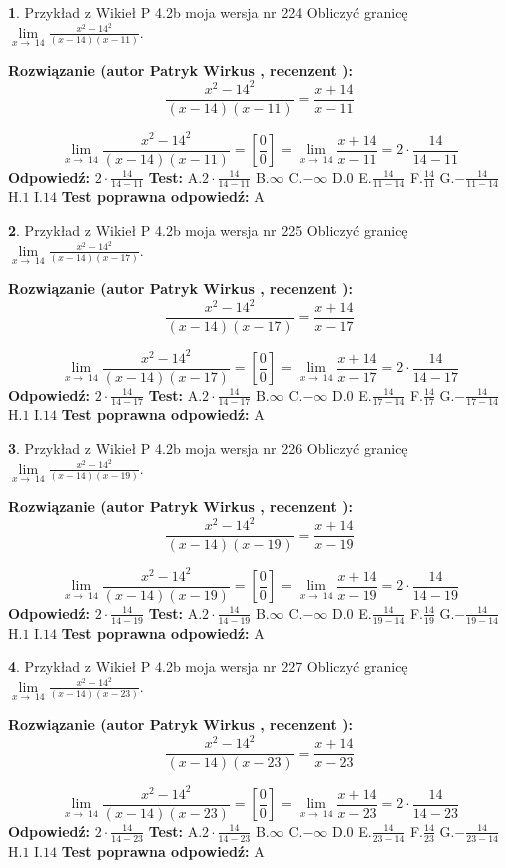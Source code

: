 \documentclass[12pt, a4paper]{article}
\theoremstyle{definition} %
\newtheorem{zad}{}
\newcommand{\zadStart}[1]{\begin{zad}#1\newline}
\newcommand{\zadStop}{\end{zad}}
\newcommand{\rozwStart}[2]{\noindent \textbf{Rozwiązanie (autor #1 , recenzent #2): }\newline}
\newcommand{\rozwStop}{\newline}
\newcommand{\odpStart}{\noindent \textbf{Odpowiedź:}\newline}
\newcommand{\odpStop}{\newline}
\newcommand{\testStart}{\noindent \textbf{Test:}\newline}
\newcommand{\testStop}{\newline}
\newcommand{\kluczStart}{\noindent \textbf{Test poprawna odpowiedź:}\newline}
\newcommand{\kluczStop}{\newline}
\begin{document}
\zadStart{Przykład z Wikieł P 4.2b moja wersja nr 224}
Obliczyć granicę $\lim\limits_{x\to\ 14}\frac{x^{2}-14^{2}}{(x-14)(x-11)}$.
\zadStop
\rozwStart{Patryk Wirkus}{}
$$\frac{x^{2}-14^{2}}{(x-14)(x-11)}=\frac{x+14}{x-11}$$

$$\lim\limits_{x\to\ 14}\frac{x^{2}-14^{2}}{(x-14)(x-11)}=[\frac{0}{0}]=\lim\limits_{x\to\ 14}\frac{x+14}{x-11}=2 \cdot \frac{14}{14-11}$$
\rozwStop
\odpStart
$2 \cdot \frac{14}{14-11}$
\odpStop
\testStart
A.$2 \cdot \frac{14}{14-11}$
B.$\infty$
C.$-\infty$
D.$0$
E.$\frac{14}{11-14}$
F.$\frac{14}{11}$
G.$-\frac{14}{11-14}$
H.$1$
I.$14$
\testStop
\kluczStart
A
\kluczStop



\zadStart{Przykład z Wikieł P 4.2b moja wersja nr 225}
Obliczyć granicę $\lim\limits_{x\to\ 14}\frac{x^{2}-14^{2}}{(x-14)(x-17)}$.
\zadStop
\rozwStart{Patryk Wirkus}{}
$$\frac{x^{2}-14^{2}}{(x-14)(x-17)}=\frac{x+14}{x-17}$$

$$\lim\limits_{x\to\ 14}\frac{x^{2}-14^{2}}{(x-14)(x-17)}=[\frac{0}{0}]=\lim\limits_{x\to\ 14}\frac{x+14}{x-17}=2 \cdot \frac{14}{14-17}$$
\rozwStop
\odpStart
$2 \cdot \frac{14}{14-17}$
\odpStop
\testStart
A.$2 \cdot \frac{14}{14-17}$
B.$\infty$
C.$-\infty$
D.$0$
E.$\frac{14}{17-14}$
F.$\frac{14}{17}$
G.$-\frac{14}{17-14}$
H.$1$
I.$14$
\testStop
\kluczStart
A
\kluczStop



\zadStart{Przykład z Wikieł P 4.2b moja wersja nr 226}
Obliczyć granicę $\lim\limits_{x\to\ 14}\frac{x^{2}-14^{2}}{(x-14)(x-19)}$.
\zadStop
\rozwStart{Patryk Wirkus}{}
$$\frac{x^{2}-14^{2}}{(x-14)(x-19)}=\frac{x+14}{x-19}$$

$$\lim\limits_{x\to\ 14}\frac{x^{2}-14^{2}}{(x-14)(x-19)}=[\frac{0}{0}]=\lim\limits_{x\to\ 14}\frac{x+14}{x-19}=2 \cdot \frac{14}{14-19}$$
\rozwStop
\odpStart
$2 \cdot \frac{14}{14-19}$
\odpStop
\testStart
A.$2 \cdot \frac{14}{14-19}$
B.$\infty$
C.$-\infty$
D.$0$
E.$\frac{14}{19-14}$
F.$\frac{14}{19}$
G.$-\frac{14}{19-14}$
H.$1$
I.$14$
\testStop
\kluczStart
A
\kluczStop



\zadStart{Przykład z Wikieł P 4.2b moja wersja nr 227}
Obliczyć granicę $\lim\limits_{x\to\ 14}\frac{x^{2}-14^{2}}{(x-14)(x-23)}$.
\zadStop
\rozwStart{Patryk Wirkus}{}
$$\frac{x^{2}-14^{2}}{(x-14)(x-23)}=\frac{x+14}{x-23}$$

$$\lim\limits_{x\to\ 14}\frac{x^{2}-14^{2}}{(x-14)(x-23)}=[\frac{0}{0}]=\lim\limits_{x\to\ 14}\frac{x+14}{x-23}=2 \cdot \frac{14}{14-23}$$
\rozwStop
\odpStart
$2 \cdot \frac{14}{14-23}$
\odpStop
\testStart
A.$2 \cdot \frac{14}{14-23}$
B.$\infty$
C.$-\infty$
D.$0$
E.$\frac{14}{23-14}$
F.$\frac{14}{23}$
G.$-\frac{14}{23-14}$
H.$1$
I.$14$
\testStop
\kluczStart
A
\kluczStop
\end{document}

